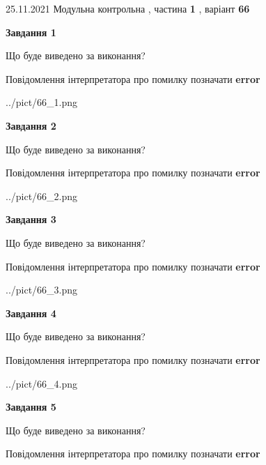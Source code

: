 \documentclass[10pt, ukrainian]{article}
\begin{document}
{25.11.2021 Модульна контрольна , частина \textbf { 1 }, варіант  \No \textbf { 66 }\par}
{
\begin {large}

{\begin {center}\textbf{Завдання 1}\end {center}}\par
Що буде виведено за виконання? \par
Повідомлення інтерпретатора про помилку позначати \textbf{error}

\begin{center}
	{../pict/66_1.png}
\end{center}
\newpage

{\begin {center}\textbf{Завдання 2}\end {center}}\par
Що буде виведено за виконання? \par
Повідомлення інтерпретатора про помилку позначати \textbf{error}

\begin{center}
	{../pict/66_2.png}
\end{center}
\newpage

{\begin {center}\textbf{Завдання 3}\end {center}}\par
Що буде виведено за виконання? \par
Повідомлення інтерпретатора про помилку позначати \textbf{error}

\begin{center}
	{../pict/66_3.png}
\end{center}
\newpage

{\begin {center}\textbf{Завдання 4}\end {center}}\par
Що буде виведено за виконання? \par
Повідомлення інтерпретатора про помилку позначати \textbf{error}

\begin{center}
	{../pict/66_4.png}
\end{center}
\newpage

{\begin {center}\textbf{Завдання 5}\end {center}}\par
Що буде виведено за виконання? \par
Повідомлення інтерпретатора про помилку позначати \textbf{error}


\end{large}}
\end{document}
